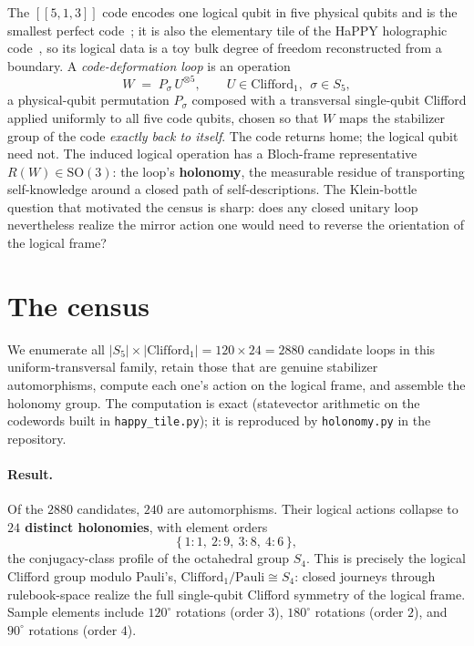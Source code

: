 \documentclass[11pt]{article}
\newcommand{\Sfour}{S_4}
\newcommand{\code}{[[5,1,3]]}
\begin{document}
The $\code$ code encodes one logical qubit in five physical qubits and is the
smallest perfect code~\cite{laflamme}; it is also the elementary tile of the
HaPPY holographic code~\cite{happy}, so its logical data is a toy bulk degree of
freedom reconstructed from a boundary. A \emph{code-deformation loop} is an
operation
\begin{equation}
  W \;=\; P_\sigma\, U^{\otimes 5},
  \qquad U \in \mathrm{Clifford}_1,\ \ \sigma\in S_5,
\end{equation}
a physical-qubit permutation $P_\sigma$ composed with a transversal
single-qubit Clifford applied uniformly to all five code qubits, chosen so that
$W$ maps the stabilizer group of the code
\emph{exactly back to itself}. The code returns home; the logical qubit need
not. The induced logical operation has a Bloch-frame representative
$R(W)\in \mathrm{SO}(3)$: the loop's \textbf{holonomy}, the measurable residue of
transporting self-knowledge around a closed path of self-descriptions. The
Klein-bottle question that motivated the census is sharp: does any closed
unitary loop nevertheless realize the mirror action one would need to reverse
the orientation of the logical frame?

\section{The census}

We enumerate all $|S_5|\times|\mathrm{Clifford}_1| = 120\times 24 = 2880$
candidate loops in this uniform-transversal family, retain those that are genuine stabilizer automorphisms,
compute each one's action on the logical frame, and assemble the holonomy
group. The computation is exact (statevector arithmetic on the codewords built
in \texttt{happy\_tile.py}); it is reproduced by \texttt{holonomy.py} in the
repository.

\paragraph{Result.} Of the $2880$ candidates, $240$ are automorphisms. Their
logical actions collapse to \textbf{$24$ distinct holonomies}, with element
orders
\begin{equation}
  \{\,1{:}1,\ 2{:}9,\ 3{:}8,\ 4{:}6\,\},
\end{equation}
the conjugacy-class profile of the octahedral group $\Sfour$. This is precisely
the logical Clifford group modulo Pauli's, $\mathrm{Clifford}_1/\mathrm{Pauli} \cong
\Sfour$: closed journeys through rulebook-space realize the full single-qubit
Clifford symmetry of the logical frame. Sample elements include $120^\circ$
rotations (order $3$), $180^\circ$ rotations (order $2$), and $90^\circ$
rotations (order $4$).
\end{document}
